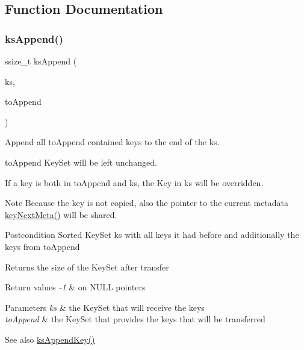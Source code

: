 \subsection{Function Documentation}
\mbox{\label{group__keyset_ga21eb9c3a14a604ee3a8bdc779232e7b7}} 
\subsubsection{\texorpdfstring{ks\+Append()}{ksAppend()}}
{\footnotesize\ttfamily ssize\+\_\+t ks\+Append (\begin{DoxyParamCaption}\item[{Key\+Set $\ast$}]{ks,  }\item[{const Key\+Set $\ast$}]{to\+Append }\end{DoxyParamCaption})}



Append all {\ttfamily to\+Append} contained keys to the end of the {\ttfamily ks}. 

{\ttfamily to\+Append} Key\+Set will be left unchanged.

If a key is both in to\+Append and ks, the Key in ks will be overridden.

\begin{DoxyNote}{Note}
Because the key is not copied, also the pointer to the current metadata \hyperlink{group__keymeta_ga4c88342f580a4291455a801af71ce048}{key\+Next\+Meta()} will be shared.
\end{DoxyNote}
\begin{DoxyPostcond}{Postcondition}
Sorted Key\+Set ks with all keys it had before and additionally the keys from to\+Append 
\end{DoxyPostcond}
\begin{DoxyReturn}{Returns}
the size of the Key\+Set after transfer 
\end{DoxyReturn}

\begin{DoxyRetVals}{Return values}
{\em -\/1} & on N\+U\+LL pointers \\
\hline
\end{DoxyRetVals}

\begin{DoxyParams}{Parameters}
{\em ks} & the Key\+Set that will receive the keys \\
\hline
{\em to\+Append} & the Key\+Set that provides the keys that will be transferred \\
\hline
\end{DoxyParams}
\begin{DoxySeeAlso}{See also}
\hyperlink{group__keyset_gaa5a1d467a4d71041edce68ea7748ce45}{ks\+Append\+Key()} 
\end{DoxySeeAlso}
\mbox{\label{group__keyset_gaa5a1d467a4d71041edce68ea7748ce45}} 
